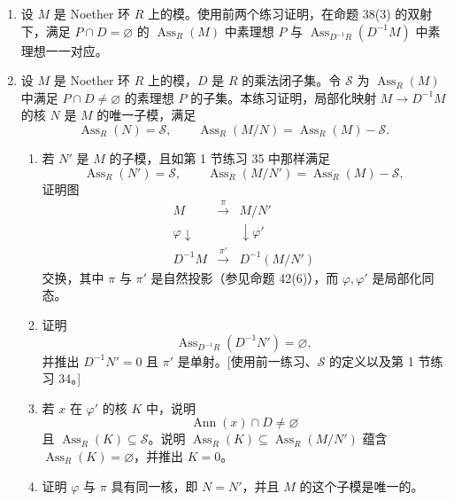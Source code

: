 \begin{enumerate}[label=\arabic*.,start=30]
	\item 设 $M$ 是 Noether 环 $R$ 上的模。使用前两个练习证明，在命题 38(3) 的双射下，满足 $P\cap D=\varnothing$ 的 $\operatorname{Ass}_R(M)$ 中素理想 $P$ 与 $\operatorname{Ass}_{D^{-1}R}(D^{-1}M)$ 中素理想一一对应。
	
	\item 设 $M$ 是 Noether 环 $R$ 上的模，$D$ 是 $R$ 的乘法闭子集。令 $\mathcal S$ 为 $\operatorname{Ass}_R(M)$ 中满足 $P\cap D\ne\varnothing$ 的素理想 $P$ 的子集。本练习证明，局部化映射 $M\to D^{-1}M$ 的核 $N$ 是 $M$ 的唯一子模，满足
	\[
	\operatorname{Ass}_R(N)=\mathcal S,
	\qquad
	\operatorname{Ass}_R(M/N)=\operatorname{Ass}_R(M)-\mathcal S.
	\]
	\begin{enumerate}[label=(\alph*)]
		\item 若 $N'$ 是 $M$ 的子模，且如第 1 节练习 35 中那样满足
		\[
		\operatorname{Ass}_R(N')=\mathcal S,
		\qquad
		\operatorname{Ass}_R(M/N')=\operatorname{Ass}_R(M)-\mathcal S,
		\]
		证明图
		\[
		\begin{array}{ccc}
			M & \xrightarrow{\pi} & M/N'\\
			\varphi\downarrow & & \downarrow \varphi'\\
			D^{-1}M & \xrightarrow{\pi'} & D^{-1}(M/N')
		\end{array}
		\]
		交换，其中 $\pi$ 与 $\pi'$ 是自然投影（参见命题 42(6)），而 $\varphi,\varphi'$ 是局部化同态。
		\item 证明
		\[
		\operatorname{Ass}_{D^{-1}R}(D^{-1}N')=\varnothing,
		\]
		并推出 $D^{-1}N'=0$ 且 $\pi'$ 是单射。[使用前一练习、$\mathcal S$ 的定义以及第 1 节练习 34。]
		\item 若 $x$ 在 $\varphi'$ 的核 $K$ 中，说明
		\[
		\operatorname{Ann}(x)\cap D\ne\varnothing
		\]
		且 $\operatorname{Ass}_R(K)\subseteq\mathcal S$。说明 $\operatorname{Ass}_R(K)\subseteq\operatorname{Ass}_R(M/N')$ 蕴含 $\operatorname{Ass}_R(K)=\varnothing$，并推出 $K=0$。
		\item 证明 $\varphi$ 与 $\pi$ 具有同一核，即 $N=N'$，并且 $M$ 的这个子模是唯一的。
	\end{enumerate}
\end{enumerate}

